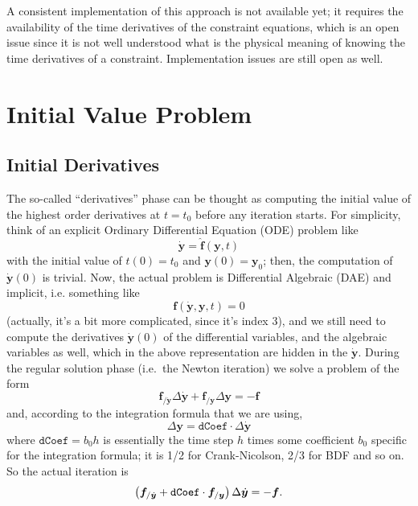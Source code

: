 \documentclass[10pt,dvips,fleqn,subeqn]{report}
\newcommand{\T}[1]{\bm{#1}}
\begin{document}
A consistent implementation of this approach is not available yet;
it requires the availability of the time derivatives 
of the constraint equations, which is an open issue since it is not
well understood what is the physical meaning of knowing 
the time derivatives of a constraint.
Implementation issues are still open as well.


\section{Initial Value Problem}
\subsection{Initial Derivatives}
The so-called ``derivatives'' phase can be thought as computing
the initial value of the highest order derivatives at $t=t_0$
before any iteration starts.
For simplicity, think of an explicit Ordinary Differential Equation
(ODE) problem like
\begin{equation}
	\dot{\T{y}} = \hat{\T{f}}(\T{y}, t)
\end{equation}
with the initial value of $t(0) = t_0$ and $\T{y}(0) = \T{y}_0$; 
then, the computation of $\dot{\T{y}}(0)$ is trivial.  
Now, the actual problem is Differential Algebraic (DAE) and implicit, 
i.e. something like
\begin{equation}
  \T{f}(\dot{\T{y}}, \T{y}, t) = 0
\end{equation}
(actually, it's a bit more complicated, since it's index 3), 
and we still need to compute the derivatives $\dot{\T{y}}(0)$ 
of the differential variables, and the algebraic variables as well, 
which in the above representation are hidden in the $\dot{\T{y}}$.
During the regular solution phase (i.e.\ the Newton iteration) 
we solve a problem of the form
\begin{equation}
  \T{f}_{/\dot{\T{y}}} \Delta \dot{\T{y}} + \T{f}_{/\T{y}} \Delta \T{y} = - \T{f}
\end{equation}
and, according to the integration formula that we are using,
\begin{equation}
  \Delta \T{y} = \texttt{dCoef} \cdot \Delta \dot{\T{y}}
\end{equation}
where $\texttt{dCoef} = b_0 h$ is essentially the time step $h$
times some coefficient $b_0$ specific for the integration formula;
it is 1/2 for Crank-Nicolson, 2/3 for BDF and so on.
So the actual iteration is
\begin{equation}
	\plbr{\T{f}_{/\dot{\T{y}}} + \texttt{dCoef} \cdot \T{f}_{/\T{y}} } \Delta \dot{\T{y}} = - \T{f}
	\label{eq:derivatives:iteration}
	.
\end{equation}
\end{document}
